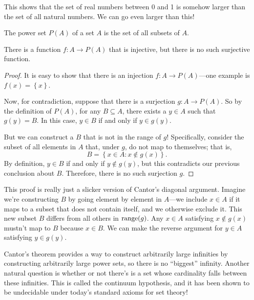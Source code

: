 \documentclass[../m131main.tex]{subfiles}
\begin{document}
This shows that the set of real numbers between 0 and 1 is somehow larger than the set of all natural numbers.
We can go even larger than this!

\begin{definition}
    The power set $P(A)$ of a set $A$ is the set of all subsets of $A$.
\end{definition}

\begin{theorem}
    There is a function $f : A \to P(A)$ that is injective, but there is no such surjective function.
\end{theorem}

\begin{proof}
    It is easy to show that there is an injection $f: A \to P(A)$---one example is $f(x) = \left\{ x \right\}$.

    Now, for contradiction, suppose that there is a surjection $g : A \to P(A)$.
    So by the definition of $P(A)$, for any $B \subseteq A$, there exists a $y \in A$ such that $g(y) = B$.
    In this case, $y \in B$ if and only if $y \in g(y)$.

    But we can construct a $B$ that is not in the range of $g$!
    Specifically, consider the subset of all elements in $A$ that, under $g$, do not map to themselves; that is,
    \[ B = \left\{ x \in A : x \not\in g(x) \right\}. \]
    By definition, $y \in B$ if and only if $y \not\in g(y)$, but this contradicts our previous conclusion about $B$.
    Therefore, there is no such surjection $g$.
\end{proof}

This proof is really just a slicker version of Cantor's diagonal argument.
Imagine we're constructing $B$ by going element by element in $A$---we include $x \in A$ if it maps to a subset that does not contain itself, and we otherwise exclude it.
This new subset $B$ differs from all others in $\operatorname{range}(g)$.
Any $x \in A$ satisfying $x \not\in g(x)$ mustn't map to $B$ because $x \in B$.
We can make the reverse argument for $y \in A$ satisfying $y \in g(y)$.

Cantor's theorem provides a way to construct arbitrarily large infinities by constructing arbitrarily large power sets, so there is no ``biggest'' infinity.
Another natural question is whether or not there's is a set whose cardinality falls between these infinities.
This is called the continuum hypothesis, and it has been shown to be undecidable under today's standard axioms for set theory!
\end{document}
